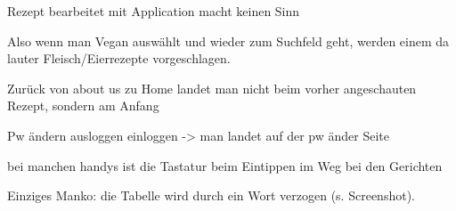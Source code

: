 Rezept bearbeitet mit Application macht keinen Sinn

    Also wenn man Vegan auswählt und wieder zum Suchfeld geht, werden einem da lauter Fleisch/Eierrezepte vorgeschlagen. 
    
     Zurück von about us zu Home landet man nicht beim vorher angeschauten Rezept, sondern am Anfang

 Pw ändern ausloggen einloggen -> man landet auf der pw änder Seite 

bei manchen handys ist die Tastatur beim Eintippen im Weg bei den Gerichten

 Einziges Manko: die Tabelle wird durch ein Wort verzogen (s. Screenshot). 




